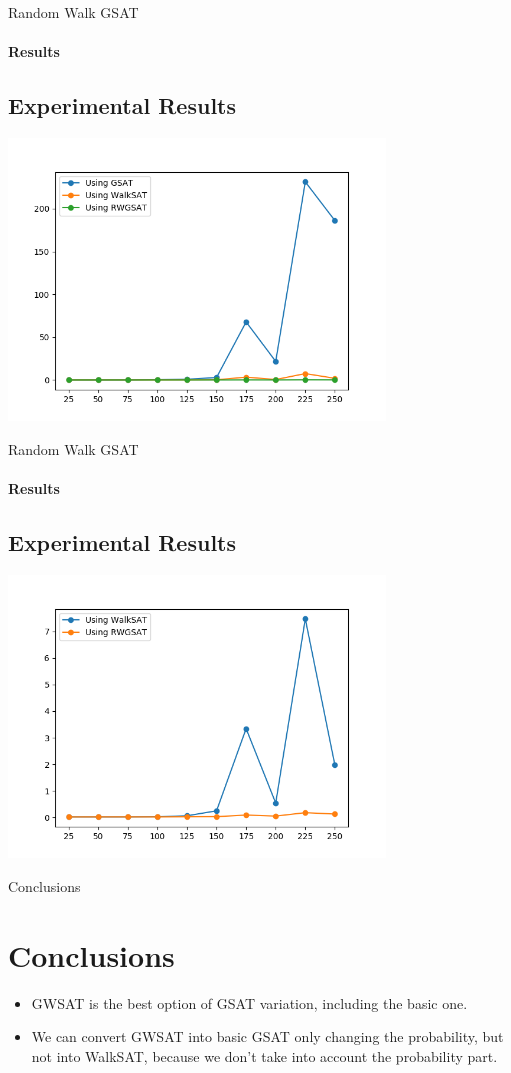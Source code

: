 \documentclass{beamer}
\begin{document}
\begin{frame}{Random Walk GSAT}
\framesubtitle{Results}
\subsection{Experimental Results}

\includegraphics[width=10cm]{imgs/50-graphic-2.png}

\end{frame}
\begin{frame}{Random Walk GSAT}
\framesubtitle{Results}
\subsection{Experimental Results}

\includegraphics[width=10cm]{imgs/50-graphic-1.png}

\end{frame}
\begin{frame}{Conclusions}
\section{Conclusions}
\begin{itemize}
\item GWSAT is the best option of GSAT variation, including the basic one.
\item We can convert GWSAT into basic GSAT only changing the probability, but not into WalkSAT, because we don't take into account the probability part.
\end{itemize}
\end{frame}
\end{document}
